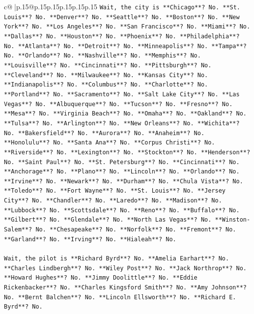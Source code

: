 \documentclass{article}
\begin{document}
{\begin{supertabular}{c@{$\;$}|p{.15\linewidth}@{}p{.15\linewidth}p{.15\linewidth}p{.15\linewidth}p{.15\linewidth}p{.15\linewidth}}
{{{\texttt{Wait, the city is **Chicago**? No. **St. Louis**? No. **Denver**? No. **Seattle**? No. **Boston**? No. **New York**? No. **Los Angeles**? No. **San Francisco**? No. **Miami**? No. **Dallas**? No. **Houston**? No. **Phoenix**? No. **Philadelphia**? No. **Atlanta**? No. **Detroit**? No. **Minneapolis**? No. **Tampa**? No. **Orlando**? No. **Nashville**? No. **Memphis**? No. **Louisville**? No. **Cincinnati**? No. **Pittsburgh**? No. **Cleveland**? No. **Milwaukee**? No. **Kansas City**? No. **Indianapolis**? No. **Columbus**? No. **Charlotte**? No. **Portland**? No. **Sacramento**? No. **Salt Lake City**? No. **Las Vegas**? No. **Albuquerque**? No. **Tucson**? No. **Fresno**? No. **Mesa**? No. **Virginia Beach**? No. **Omaha**? No. **Oakland**? No. **Tulsa**? No. **Arlington**? No. **New Orleans**? No. **Wichita**? No. **Bakersfield**? No. **Aurora**? No. **Anaheim**? No. **Honolulu**? No. **Santa Ana**? No. **Corpus Christi**? No. **Riverside**? No. **Lexington**? No. **Stockton**? No. **Henderson**? No. **Saint Paul**? No. **St. Petersburg**? No. **Cincinnati**? No. **Anchorage**? No. **Plano**? No. **Lincoln**? No. **Orlando**? No. **Irvine**? No. **Newark**? No. **Durham**? No. **Chula Vista**? No. **Toledo**? No. **Fort Wayne**? No. **St. Louis**? No. **Jersey City**? No. **Chandler**? No. **Laredo**? No. **Madison**? No. **Lubbock**? No. **Scottsdale**? No. **Reno**? No. **Buffalo**? No. **Gilbert**? No. **Glendale**? No. **North Las Vegas**? No. **Winston{-}Salem**? No. **Chesapeake**? No. **Norfolk**? No. **Fremont**? No. **Garland**? No. **Irving**? No. **Hialeah**? No.} \\
\\ 
\texttt{Wait, the pilot is **Richard Byrd**? No. **Amelia Earhart**? No. **Charles Lindbergh**? No. **Wiley Post**? No. **Jack Northrop**? No. **Howard Hughes**? No. **Jimmy Doolittle**? No. **Eddie Rickenbacker**? No. **Charles Kingsford Smith**? No. **Amy Johnson**? No. **Bernt Balchen**? No. **Lincoln Ellsworth**? No. **Richard E. Byrd**? No.} \\
\\ 
}}}
\end{supertabular}}
\end{document}
